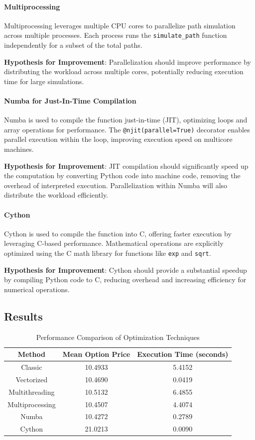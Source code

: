 \documentclass[12pt,a4paper]{report}
\begin{document}
\paragraph{Multiprocessing}  
Multiprocessing leverages multiple CPU cores to parallelize path simulation across multiple processes. Each process runs the \texttt{simulate\_path} function independently for a subset of the total paths.

\textbf{Hypothesis for Improvement}: Parallelization should improve performance by distributing the workload across multiple cores, potentially reducing execution time for large simulations.

\paragraph{Numba for Just-In-Time Compilation}  
Numba is used to compile the function just-in-time (JIT), optimizing loops and array operations for performance. The \texttt{@njit(parallel=True)} decorator enables parallel execution within the loop, improving execution speed on multicore machines.

\textbf{Hypothesis for Improvement}: JIT compilation should significantly speed up the computation by converting Python code into machine code, removing the overhead of interpreted execution. Parallelization within Numba will also distribute the workload efficiently.

\paragraph{Cython}  
Cython is used to compile the function into C, offering faster execution by leveraging C-based performance. Mathematical operations are explicitly optimized using the C math library for functions like \texttt{exp} and \texttt{sqrt}.

\textbf{Hypothesis for Improvement}: Cython should provide a substantial speedup by compiling Python code to C, reducing overhead and increasing efficiency for numerical operations.

\subsection{Results}

\begin{table}[h!]
\centering
\begin{tabular}{|c|c|c|}
\hline
\textbf{Method} & \textbf{Mean Option Price} & \textbf{Execution Time (seconds)} \\ \hline
Classic & 10.4933 & 5.4152 \\ \hline
Vectorized & 10.4690 & 0.0419 \\ \hline
Multithreading & 10.5132 & 6.4855 \\ \hline
Multiprocessing & 10.4507 & 4.4074 \\ \hline
Numba & 10.4272 & 0.2789 \\ \hline
Cython & 21.0213 & 0.0090 \\ \hline
\end{tabular}
\caption{Performance Comparison of Optimization Techniques}
\end{table}
\end{document}
